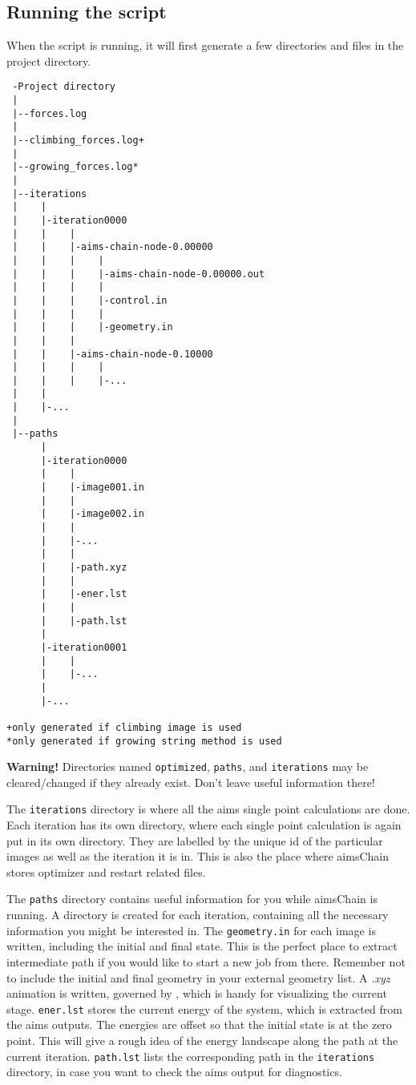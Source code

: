\subsection{Running the script}
When the script is running, it will first generate a few directories and files in the project directory. 

\begin{verbatim}
 -Project directory
 |
 |--forces.log
 |
 |--climbing_forces.log+
 |
 |--growing_forces.log*
 |
 |--iterations
 |    |
 |    |-iteration0000
 |    |    |
 |    |    |-aims-chain-node-0.00000
 |    |    |	|
 |    |    |	|-aims-chain-node-0.00000.out
 |    |    |	|
 |    |    |	|-control.in
 |    |    |	|
 |    |    |	|-geometry.in
 |    |    |
 |    |	   |-aims-chain-node-0.10000
 |    |	   |    |
 |    |    |    |-...
 |    |
 |    |-...
 |
 |--paths
      |
      |-iteration0000
      |    |
      |    |-image001.in
      |    |
      |    |-image002.in
      |    |
      |    |-...
      |    |
      |    |-path.xyz
      |    |
      |    |-ener.lst
      |    |
      |    |-path.lst
      |    
      |-iteration0001
      |    |
      |    |-...
      |    
      |-...
      
+only generated if climbing image is used
*only generated if growing string method is used
\end{verbatim}

\textbf{Warning!} Directories named \texttt{optimized}, \texttt{paths}, and \texttt{iterations} may be cleared/changed if they already exist. Don't leave useful information there!

The \texttt{iterations} directory is where all the aims single point calculations are done. Each iteration has its own directory, where each single point calculation is again put in its own directory. They are labelled by the unique id of the particular images as well as the iteration it is in. This is also the place where aimsChain stores optimizer and restart related files. 

The \texttt{paths} directory contains useful information for you while aimsChain is running. A directory is created for each iteration, containing all the necessary information you might be interested in. The \texttt{geometry.in} for each image is written, including the initial and final state. This is the perfect place to extract intermediate path if you would like to start a new job from there. Remember not to include the initial and final geometry in your external geometry list. A \textit{.xyz} animation is written, governed by , which is handy for visualizing the current stage. \texttt{ener.lst} stores the current energy of the system, which is extracted from the aims outputs. The energies are offset so that the initial state is at the zero point. This will give a rough idea of the energy landscape along the path at the current iteration. \texttt{path.lst} lists the corresponding path in the \texttt{iterations} directory, in case you want to check the aims output for diagnostics.

